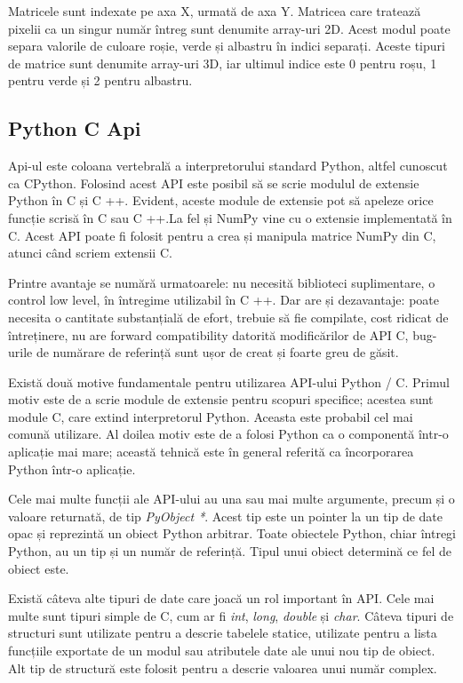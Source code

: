 Matricele sunt indexate pe axa X, urmată de axa Y. Matricea care tratează pixelii ca un singur număr întreg sunt denumite array-uri 2D. Acest modul poate separa valorile de culoare roșie, verde și albastru în indici separați. Aceste tipuri de matrice sunt denumite array-uri 3D, iar ultimul indice este 0 pentru roșu, 1 pentru verde și 2 pentru albastru.

\subsection{Python C Api}

Api-ul este coloana vertebrală a interpretorului standard Python, altfel cunoscut ca CPython. Folosind acest API este posibil să se scrie modulul de extensie Python în C și C ++. Evident, aceste module de extensie pot să apeleze orice funcție scrisă în C sau C ++.La fel și NumPy vine cu o extensie implementată în C. Acest API poate fi folosit pentru a crea și manipula matrice NumPy din C, atunci când scriem extensii C. 

Printre avantaje se numără urmatoarele: nu necesită biblioteci suplimentare, o control low level, în întregime utilizabil în C ++. Dar are și dezavantaje:
poate necesita o cantitate substanțială de efort, trebuie să fie compilate, cost ridicat de întreținere, nu are forward compatibility datorită modificărilor de API C, bug-urile de numărare de referință sunt ușor de creat și foarte greu de găsit.

Există două motive fundamentale pentru utilizarea API-ului Python / C. Primul motiv este de a scrie module de extensie pentru scopuri specifice; acestea sunt module C, care extind interpretorul Python. Aceasta este probabil cel mai comună utilizare. Al doilea motiv este de a folosi Python ca o componentă într-o aplicație mai mare; această tehnică este în general referită ca încorporarea Python într-o aplicație.

Cele mai multe funcții ale API-ului au una sau mai multe argumente, precum și o valoare returnată, de tip \textit{PyObject *}. Acest tip este un pointer la un tip de date opac și reprezintă un obiect Python arbitrar. Toate obiectele Python, chiar întregi Python, au un tip și un număr de referință. Tipul unui obiect determină ce fel de obiect este.

Există câteva alte tipuri de date care joacă un rol important în API. Cele mai multe sunt tipuri simple de C, cum ar fi \textit{int}, \textit{long}, \textit{double} și \textit{char}. Câteva tipuri de structuri sunt utilizate pentru a descrie tabelele statice, utilizate pentru a lista funcțiile exportate de un modul sau atributele date ale unui nou tip de obiect. Alt tip de structură este folosit pentru a descrie valoarea unui număr complex.

